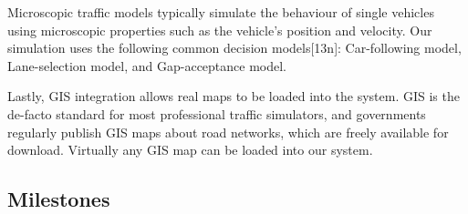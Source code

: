 \documentclass[11pt]{article}
\begin{document}
Microscopic traffic models typically simulate the behaviour of single vehicles using microscopic properties such as the vehicle\textquoteright s position and velocity. Our simulation uses the following common decision models[13n]: Car-following model, Lane-selection model, and Gap-acceptance model.

Lastly, GIS integration allows real maps to be loaded into the system. GIS is the de-facto standard for most professional traffic simulators, and governments regularly publish GIS maps about road networks, which are freely available for download. Virtually any GIS map can be loaded into our system.

\subsection{Milestones}
\end{document}
